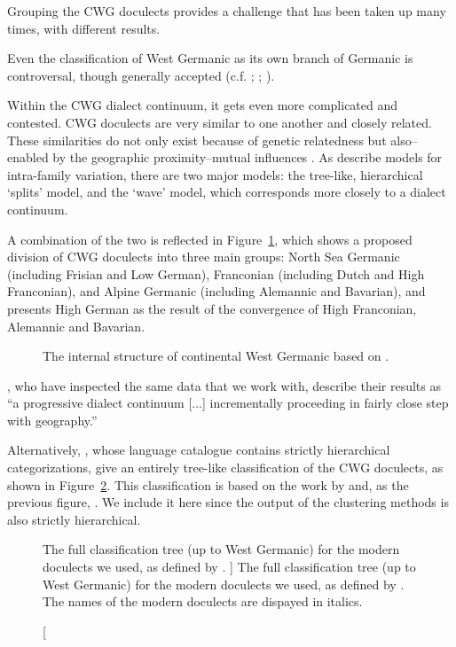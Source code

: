 \documentclass[a4paper]{article}
\begin{document}
Grouping the CWG doculects provides a challenge
that has been taken up many times, with different results.

Even the classification of West Germanic
as its own branch of Germanic is controversal,
though generally accepted
(c.f. \citet{voyles1971problem}; \citet[pp. 7-8]{harbert2007germanic}; \citet{ringe2012cladistic}). %

Within the CWG dialect continuum, it gets even more complicated and contested.
CWG doculects are very similar to one another and closely related.
These similarities do not only exist because of genetic relatedness
but also--enabled by the geographic proximity--mutual influences
\citep[p. 8]{harbert2007germanic}.
As \citet{heggarty2010splits} describe models for intra-family variation,
there are two major models:
the tree-like, hierarchical `splits' model,
and the `wave' model, which corresponds more closely to a dialect continuum.

A combination of the two is reflected in Figure~\ref{fig:cwg_harbert},
which shows a proposed division of CWG doculects
into three main groups: North Sea Germanic (including Frisian and Low German),
Franconian (including Dutch and High Franconian),
and Alpine Germanic (including Alemannic and Bavarian),
and presents High German as the result of the convergence
of High Franconian, Alemannic and Bavarian.

\begin{figure}[b]
\centering

\caption{
The internal structure of continental West Germanic
based on \citet[p. 8]{harbert2007germanic}.
}
\label{fig:cwg_harbert}
\end{figure}

\citet{heggarty2010splits}, who have inspected the same data
that we work with, describe their results as
``a progressive dialect continuum [...] incrementally proceeding in fairly close step
with geography.''

Alternatively, \citet{hammarstroem2018glottolog},
whose language catalogue contains strictly hierarchical categorizations, %
give an entirely tree-like classification of the CWG doculects,
as shown in Figure~\ref{fig:glottolog}.
This classification is based on the work by \citet{stiles2013pan-west}
and, as the previous figure, \citet{harbert2007germanic}.
We include it here since the output of the clustering methods
is also strictly hierarchical.

\begin{figure}[h]
\begin{adjustwidth}{-3cm}{-3cm}
\centering
\scalebox{0.8}{

}
\end{adjustwidth}
% 
\caption
[
The full classification tree (up to West Germanic) for the modern doculects we used,
as defined by \citet{hammarstroem2018glottolog}.
]
{
The full classification tree (up to West Germanic) for the modern doculects we used,
as defined by \citet{hammarstroem2018glottolog}.
The names of the modern doculects are dispayed in italics.
}
\label{fig:glottolog}
\end{figure}
\end{document}

